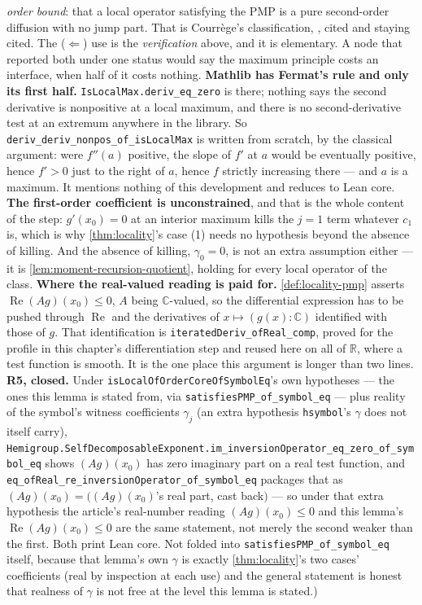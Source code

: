 \begin{lemma}
{\emph{order bound}: that a local operator satisfying the PMP is a pure second-order diffusion with
no jump part. That is Courrège's classification, , cited and staying cited. The
($\Leftarrow$) use is the \emph{verification} above, and it is elementary. A node that reported
both under one status would say the maximum principle costs an interface, when half of it costs
nothing.
\textbf{Mathlib has Fermat's rule and only its first half.} \texttt{IsLocalMax.deriv\_eq\_zero} is
there; nothing says the second derivative is nonpositive at a local maximum, and there is no
second-derivative test at an extremum anywhere in the library. So
\texttt{deriv\_deriv\_nonpos\_of\_isLocalMax} is written from scratch, by the classical argument:
were $f''(a)$ positive, the slope of $f'$ at $a$ would be eventually positive, hence $f' > 0$ just
to the right of $a$, hence $f$ strictly increasing there --- and $a$ is a maximum. It mentions
nothing of this development and reduces to Lean core.
\textbf{The first-order coefficient is unconstrained}, and that is the whole content of the
step: $g'(x_0) = 0$ at an interior maximum kills the $j = 1$ term whatever $c_1$ is, which is why
\ref{thm:locality}'s case (1) needs no hypothesis beyond the absence of killing. And the absence of
killing, $\gamma_0 = 0$, is not an extra assumption either --- it is
\ref{lem:moment-recursion-quotient}, holding for every local operator of the class.
\textbf{Where the real-valued reading is paid for.} \ref{def:locality-pmp} asserts
$\operatorname{Re}(Ag)(x_0) \le 0$, $A$ being $\mathbb{C}$-valued, so the differential expression
has to be pushed through $\operatorname{Re}$ and the derivatives of $x \mapsto (g(x):\mathbb{C})$
identified with those of $g$. That identification is \texttt{iteratedDeriv\_ofReal\_comp}, proved
for the profile in this chapter's differentiation step and reused here on all of $\mathbb{R}$, where
a test function is smooth. It is the one place this argument is longer than two lines.
\textbf{R5, closed.} Under \texttt{isLocalOfOrderCoreOfSymbolEq}'s own hypotheses --- the ones
this lemma is stated from, via \texttt{satisfiesPMP\_of\_symbol\_eq} --- plus reality of the
symbol's witness coefficients $\gamma_j$ (an extra hypothesis \texttt{hsymbol}'s $\gamma$ does not
itself carry), \texttt{Hemigroup.SelfDecomposableExponent.im\_inversionOperator\_eq\_zero\_of\_symbol\_eq}
shows $(Ag)(x_0)$ has zero imaginary part on a real test function, and
\texttt{eq\_ofReal\_re\_inversionOperator\_of\_symbol\_eq} packages that as $(Ag)(x_0) = ((Ag)(x_0)$'s
real part, cast back$)$ --- so under that extra hypothesis the article's real-number reading
$(Ag)(x_0) \le 0$ and this lemma's $\operatorname{Re}(Ag)(x_0) \le 0$ are the same statement, not
merely the second weaker than the first. Both print Lean core. Not folded into \texttt{satisfiesPMP\_of\_symbol\_eq} itself, because that lemma's
own $\gamma$ is exactly \ref{thm:locality}'s two cases' coefficients (real by inspection at each
use) and the general statement is honest that realness of $\gamma$ is not free at the level this
lemma is stated.)}
\end{lemma}

